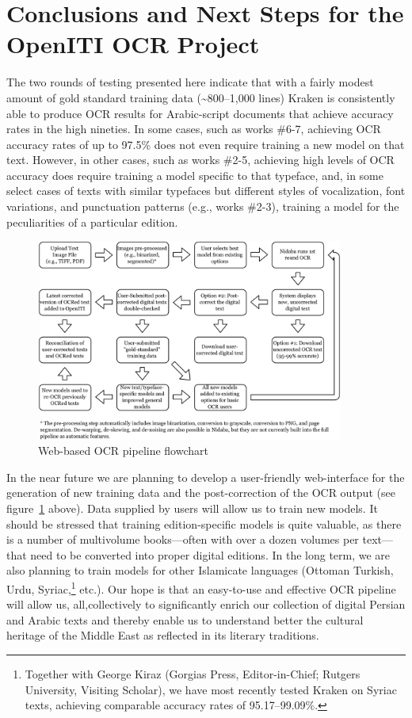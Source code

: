 \section{Conclusions and Next Steps for the OpenITI OCR Project}

The two rounds of testing presented here indicate that with a fairly modest
amount of gold standard training data (\textasciitilde800–1,000 lines) Kraken is
consistently able to produce OCR results for Arabic-script documents that
achieve accuracy rates in the high nineties. In some cases, such as works
\#6-7, achieving OCR accuracy rates of up to 97.5\% does not even require
training a new model on that text. However, in other cases, such as works
\#2-5, achieving high levels of OCR accuracy does require training a model
specific to that typeface, and, in some select cases of texts with similar
typefaces but different styles of vocalization, font variations, and
punctuation patterns (e.g., works \#2-3), training a model for the
peculiarities of a particular edition.

\begin{figure}
        \centering
        \includegraphics[width=0.9\textwidth]{images/image3.png}
	\caption{Web-based OCR pipeline flowchart}
	\label{fig:soa_2}
\end{figure}
  

In the near future we are planning to develop a user-friendly web-interface for
the generation of new training data and the post-correction of the OCR output
(see figure~\ref{fig:soa_2} above). Data supplied by users will allow us to train new
models. It should be stressed that training edition-specific models is quite
valuable, as there is a number of multivolume books—often with over a dozen
volumes per text—that need to be converted into proper digital editions. In the
long term, we are also planning to train models for other Islamicate languages
(Ottoman Turkish, Urdu, Syriac,\footnote{Together with George Kiraz (Gorgias
Press, Editor-in-Chief; Rutgers University, Visiting Scholar), we have most
recently tested Kraken on Syriac texts, achieving comparable accuracy rates of
95.17–99.09\%.} etc.). Our hope is that an easy-to-use and effective OCR
pipeline will allow us, all,collectively to significantly enrich our collection
of digital Persian and Arabic texts and thereby enable us to understand better
the cultural heritage of the Middle East as reflected in its literary
traditions.


